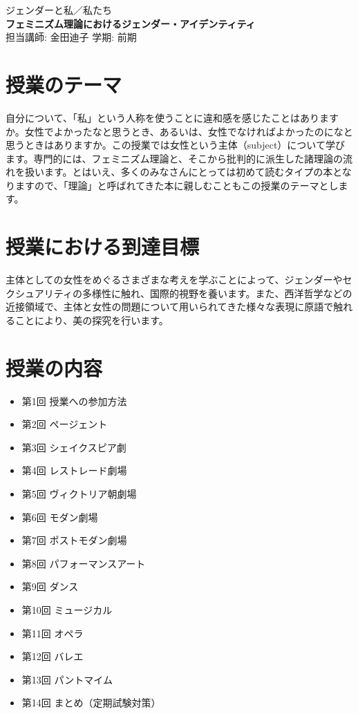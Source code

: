 \documentclass{jlreq}
\begin{document}

\begin{center}
    \huge{ジェンダーと私／私たち} \\
    \large{\textbf{フェミニズム理論におけるジェンダー・アイデンティティ}} \\
    \vspace{0.3cm}
    \large{担当講師: 金田迪子 \quad 学期: 前期}
\end{center}
\vspace{0.5cm}

\begin{multicols}{2}
\section*{授業のテーマ}
自分について、「私」という人称を使うことに違和感を感じたことはありますか。女性でよかったなと思うとき、あるいは、女性でなければよかったのになと思うときはありますか。この授業では女性という主体（subject）について学びます。専門的には、フェミニズム理論と、そこから批判的に派生した諸理論の流れを扱います。とはいえ、多くのみなさんにとっては初めて読むタイプの本となりますので、「理論」と呼ばれてきた本に親しむこともこの授業のテーマとします。
\section*{授業における到達目標}
主体としての女性をめぐるさまざまな考えを学ぶことによって、ジェンダーやセクシュアリティの多様性に触れ、国際的視野を養います。また、西洋哲学などの近接領域で、主体と女性の問題について用いられてきた様々な表現に原語で触れることにより、美の探究を行います。

\section*{授業の内容}
\begin{itemize}
\item 第1回 授業への参加方法
\item 第2回 ページェント
\item 第3回 シェイクスピア劇
\item 第4回 レストレード劇場
\item 第5回 ヴィクトリア朝劇場
\item 第6回 モダン劇場
\item 第7回 ポストモダン劇場
\item 第8回 パフォーマンスアート
\item 第9回 ダンス
\item 第10回 ミュージカル
\item 第11回 オペラ
\item 第12回 バレエ
\item 第13回 パントマイム
\item 第14回 まとめ（定期試験対策）
\end{itemize}


\end{multicols}
\end{document}
